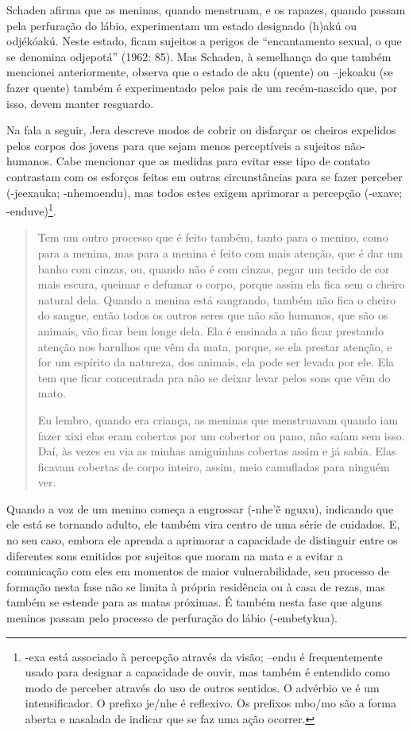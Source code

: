 Schaden afirma que as meninas, quando menstruam, e os rapazes, quando
passam pela perfuração do lábio, experimentam um estado designado
(h)akú ou odjékóakú. Neste estado, ficam sujeitos a perigos de
``encantamento sexual, o que se denomina odjepotá'' (1962: 85). Mas
Schaden, à semelhança do que também mencionei anteriormente, observa
que o estado de aku (quente) ou –jekoaku (se fazer quente) também é
experimentado pelos pais de um recém-nascido que, por isso, devem
manter resguardo. 

Na fala a seguir, Jera descreve modos de cobrir ou disfarçar os cheiros
expelidos pelos corpos dos jovens para que sejam menos perceptíveis a
sujeitos não-humanos. Cabe mencionar que as medidas para evitar esse
tipo de contato contrastam com os esforços feitos em outras
circunstâncias para se fazer perceber (-jeexauka; -nhemoendu), mas
todos estes exigem aprimorar a percepção (-exave;
-enduve)\footnote{{}-exa está associado à percepção através da visão;
–endu é frequentemente usado para designar a capacidade de ouvir, mas
também é entendido como modo de perceber através do uso de outros
sentidos. O advérbio ve é um intensificador. O prefixo je/nhe é
reflexivo. Os prefixos mbo/mo são a forma aberta e nasalada de indicar
que se faz uma ação ocorrer. }. 

\begin{quotation}
\noindent
Tem um outro processo que é feito também, tanto para o menino, como para
a menina, mas para a menina é feito com mais atenção, que é dar um
banho com cinzas, ou, quando não é com cinzas, pegar um tecido de cor
mais escura, queimar e defumar o corpo, porque assim ela fica sem o
cheiro natural dela. Quando a menina está sangrando, também não fica o
cheiro do sangue, então todos os outros seres que não são humanos, que
são os animais, vão ficar bem longe dela. Ela é ensinada a não ficar
prestando atenção nos barulhos que vêm da mata, porque, se ela prestar
atenção, e for um espírito da natureza, dos animais, ela pode ser
levada por ele. Ela tem que ficar concentrada pra não se deixar levar
pelos sons que vêm do mato.

\noindent
Eu lembro, quando era criança, as meninas que menstruavam quando iam
fazer xixi elas eram cobertas por um cobertor ou pano, não saíam sem
isso. Daí, às vezes eu via as minhas amiguinhas cobertas assim e já
sabia. Elas ficavam cobertas de corpo inteiro, assim, meio camufladas
para ninguém ver.
\end{quotation}

Quando a voz de um menino começa a engrossar
(-nhe'\~{e} nguxu), indicando que ele está se
tornando adulto, ele também vira centro de uma série de cuidados. E, no
seu caso, embora ele aprenda a aprimorar a capacidade de distinguir
entre os diferentes sons emitidos por sujeitos que moram na mata e a
evitar a comunicação com eles em momentos de maior vulnerabilidade, seu
processo de formação nesta fase não se limita à própria residência ou à
casa de rezas, mas também se estende para as matas próximas. É também
nesta fase que alguns meninos passam pelo processo de perfuração do
lábio (-embetykua). 

